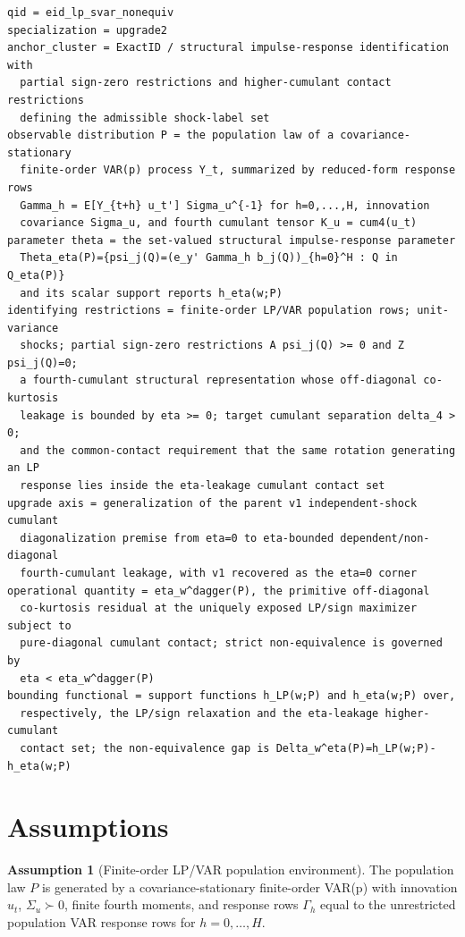 \documentclass[11pt]{article}
\theoremstyle{definition}
\newtheorem{assumption}{Assumption}
\theoremstyle{plain}
\theoremstyle{remark}
\begin{document}
\begin{verbatim}
qid = eid_lp_svar_nonequiv
specialization = upgrade2
anchor_cluster = ExactID / structural impulse-response identification with
  partial sign-zero restrictions and higher-cumulant contact restrictions
  defining the admissible shock-label set
observable distribution P = the population law of a covariance-stationary
  finite-order VAR(p) process Y_t, summarized by reduced-form response rows
  Gamma_h = E[Y_{t+h} u_t'] Sigma_u^{-1} for h=0,...,H, innovation
  covariance Sigma_u, and fourth cumulant tensor K_u = cum4(u_t)
parameter theta = the set-valued structural impulse-response parameter
  Theta_eta(P)={psi_j(Q)=(e_y' Gamma_h b_j(Q))_{h=0}^H : Q in Q_eta(P)}
  and its scalar support reports h_eta(w;P)
identifying restrictions = finite-order LP/VAR population rows; unit-variance
  shocks; partial sign-zero restrictions A psi_j(Q) >= 0 and Z psi_j(Q)=0;
  a fourth-cumulant structural representation whose off-diagonal co-kurtosis
  leakage is bounded by eta >= 0; target cumulant separation delta_4 > 0;
  and the common-contact requirement that the same rotation generating an LP
  response lies inside the eta-leakage cumulant contact set
upgrade axis = generalization of the parent v1 independent-shock cumulant
  diagonalization premise from eta=0 to eta-bounded dependent/non-diagonal
  fourth-cumulant leakage, with v1 recovered as the eta=0 corner
operational quantity = eta_w^dagger(P), the primitive off-diagonal
  co-kurtosis residual at the uniquely exposed LP/sign maximizer subject to
  pure-diagonal cumulant contact; strict non-equivalence is governed by
  eta < eta_w^dagger(P)
bounding functional = support functions h_LP(w;P) and h_eta(w;P) over,
  respectively, the LP/sign relaxation and the eta-leakage higher-cumulant
  contact set; the non-equivalence gap is Delta_w^eta(P)=h_LP(w;P)-h_eta(w;P)
\end{verbatim}

\section{Assumptions}
\begin{assumption}[Finite-order LP/VAR population environment]\label{ass:finite-var}
The population law \(P\) is generated by a covariance-stationary finite-order VAR(p) with innovation \(u_t\), \(\Sigma_u\succ0\), finite fourth moments, and response rows \(\Gamma_h\) equal to the unrestricted population VAR response rows for \(h=0,\ldots,H\).
\end{assumption}
\end{document}
